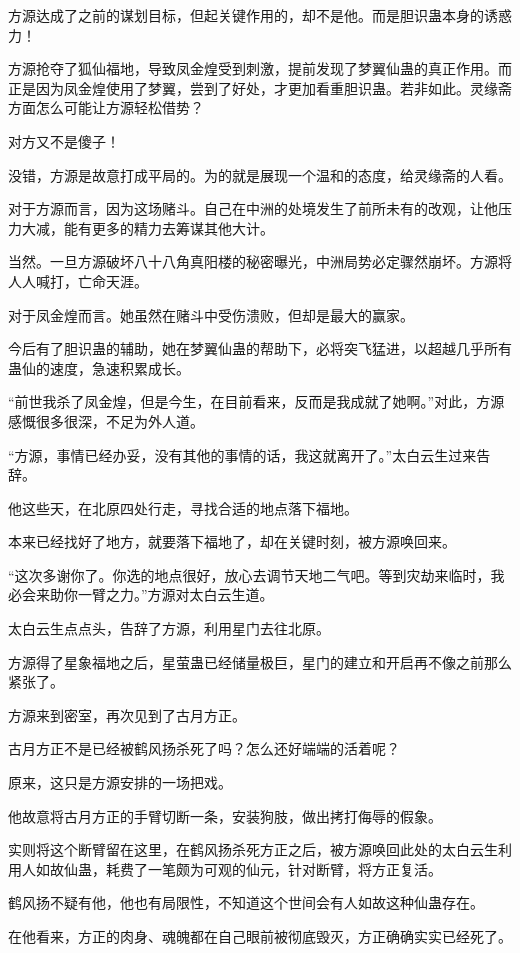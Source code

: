 \begin{this_body}
方源达成了之前的谋划目标，但起关键作用的，却不是他。而是胆识蛊本身的诱惑力！

方源抢夺了狐仙福地，导致凤金煌受到刺激，提前发现了梦翼仙蛊的真正作用。而正是因为凤金煌使用了梦翼，尝到了好处，才更加看重胆识蛊。若非如此。灵缘斋方面怎么可能让方源轻松借势？

对方又不是傻子！

没错，方源是故意打成平局的。为的就是展现一个温和的态度，给灵缘斋的人看。

对于方源而言，因为这场赌斗。自己在中洲的处境发生了前所未有的改观，让他压力大减，能有更多的精力去筹谋其他大计。

当然。一旦方源破坏八十八角真阳楼的秘密曝光，中洲局势必定骤然崩坏。方源将人人喊打，亡命天涯。

对于凤金煌而言。她虽然在赌斗中受伤溃败，但却是最大的赢家。

今后有了胆识蛊的辅助，她在梦翼仙蛊的帮助下，必将突飞猛进，以超越几乎所有蛊仙的速度，急速积累成长。

“前世我杀了凤金煌，但是今生，在目前看来，反而是我成就了她啊。”对此，方源感慨很多很深，不足为外人道。

“方源，事情已经办妥，没有其他的事情的话，我这就离开了。”太白云生过来告辞。

他这些天，在北原四处行走，寻找合适的地点落下福地。

本来已经找好了地方，就要落下福地了，却在关键时刻，被方源唤回来。

“这次多谢你了。你选的地点很好，放心去调节天地二气吧。等到灾劫来临时，我必会来助你一臂之力。”方源对太白云生道。

太白云生点点头，告辞了方源，利用星门去往北原。

方源得了星象福地之后，星萤蛊已经储量极巨，星门的建立和开启再不像之前那么紧张了。

方源来到密室，再次见到了古月方正。

古月方正不是已经被鹤风扬杀死了吗？怎么还好端端的活着呢？

原来，这只是方源安排的一场把戏。

他故意将古月方正的手臂切断一条，安装狗肢，做出拷打侮辱的假象。

实则将这个断臂留在这里，在鹤风扬杀死方正之后，被方源唤回此处的太白云生利用人如故仙蛊，耗费了一笔颇为可观的仙元，针对断臂，将方正复活。

鹤风扬不疑有他，他也有局限性，不知道这个世间会有人如故这种仙蛊存在。

在他看来，方正的肉身、魂魄都在自己眼前被彻底毁灭，方正确确实实已经死了。


\end{this_body}
